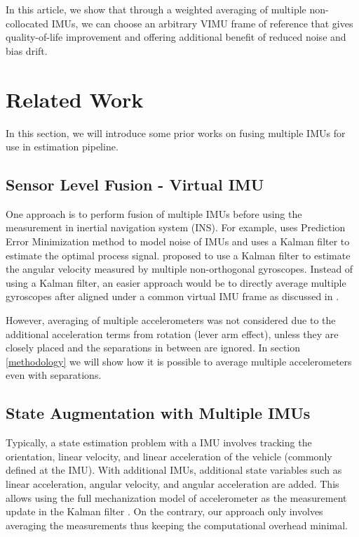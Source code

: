 \documentclass[conference]{IEEEtran}
\begin{document}
In this article, we show that through a weighted averaging of multiple non-collocated IMUs, we can choose an arbitrary VIMU frame of reference that gives quality-of-life improvement and offering additional benefit of reduced noise and bias drift.

\section{Related Work}

In this section, we will introduce some prior works on fusing multiple IMUs for use in estimation pipeline.


\subsection{Sensor Level Fusion - Virtual IMU}\label{VIMU}

One approach is to perform fusion of multiple IMUs before using the measurement in inertial navigation system (INS). For example, \cite{jafari2014_PEM} uses Prediction Error Minimization method to model noise of IMUs and uses a Kalman filter to estimate the optimal process signal. \cite{xue2023} proposed to use a Kalman filter to estimate the angular velocity measured by multiple non-orthogonal gyroscopes. Instead of using a Kalman filter, an easier approach would be to directly average multiple gyroscopes after aligned under a common virtual IMU frame as discussed in \cite{waegli2008, patel2022_multi-imu, Colomina2004REDUNDANTIF}.

However, averaging of multiple accelerometers was not considered due to the additional acceleration terms from rotation (lever arm effect), unless they are closely placed and the separations in between are ignored. In section \ref{methodology} we will show how it is possible to average multiple accelerometers even with separations.

\subsection{State Augmentation with Multiple IMUs}\label{augmented}

Typically, a state estimation problem with a IMU involves tracking the orientation, linear velocity, and linear acceleration of the vehicle (commonly defined at the IMU). With additional IMUs, additional state variables such as linear acceleration, angular velocity, and angular acceleration are added. This allows using the full mechanization model of accelerometer as the measurement update in the Kalman filter \cite{Bancroft2011DataFA, Beaudoin2018_satelite}. On the contrary, our approach only involves averaging the measurements thus keeping the computational overhead minimal.
\end{document}
